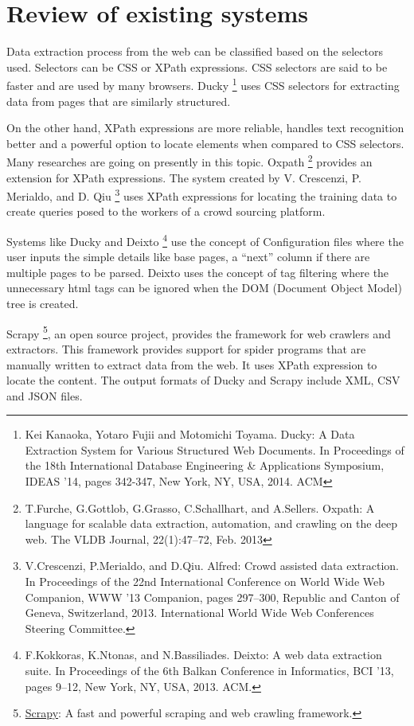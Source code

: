 \documentclass[letterpaper,12pt,english]{sphinxmanual}
\begin{document}
\chapter{Review of existing systems}
\label{index:review-of-existing-systems}
Data extraction process from the web can be classified based on the selectors used. Selectors can be CSS or XPath expressions. CSS selectors are said to be faster and are used by many browsers. Ducky \footnote{
Kei Kanaoka, Yotaro Fujii and Motomichi Toyama. Ducky: A Data Extraction System for Various Structured Web Documents. In Proceedings of the 18th International Database Engineering \& Applications Symposium, IDEAS ’14, pages 342-347, New York, NY, USA, 2014. ACM
} uses CSS selectors for extracting data from pages that are similarly structured.

On the other hand, XPath expressions are more reliable, handles text recognition better and a powerful option to locate elements when compared to CSS selectors. Many researches are going on presently in this topic. Oxpath \footnote{
T.Furche, G.Gottlob, G.Grasso, C.Schallhart, and A.Sellers. Oxpath: A language for scalable data extraction, automation, and crawling on the deep web. The VLDB Journal, 22(1):47–72, Feb. 2013
} provides an extension for XPath expressions. The system created by V. Crescenzi, P. Merialdo, and D. Qiu \footnote{
V.Crescenzi, P.Merialdo, and D.Qiu. Alfred: Crowd assisted data extraction. In Proceedings of the 22nd International Conference on World Wide Web Companion, WWW ’13 Companion, pages 297–300, Republic and Canton of Geneva, Switzerland, 2013. International World Wide Web Conferences Steering Committee.
} uses XPath expressions for locating the training data to create queries posed to the workers of a crowd sourcing platform.

Systems like Ducky and Deixto \footnote{
F.Kokkoras, K.Ntonas, and N.Bassiliades. Deixto: A web data extraction suite. In Proceedings of the 6th Balkan Conference in Informatics, BCI ’13, pages 9–12, New York, NY, USA, 2013. ACM.
} use the concept of Configuration files where the user inputs the simple details like base pages, a “next” column if there are multiple pages to be parsed. Deixto uses the concept of tag filtering where the unnecessary html tags can be ignored when the DOM (Document Object Model) tree is created.

Scrapy \footnote{
\href{https://www.scrapy.org}{Scrapy}: A fast and powerful scraping and web crawling framework.
}, an open source project, provides the framework for web crawlers and extractors. This framework provides support for spider programs that are manually written to extract data from the web. It uses XPath expression to locate the content. The output formats of Ducky and Scrapy include XML, CSV and JSON files.
\end{document}
